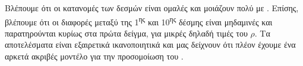 Βλέπουμε ότι οι κατανομές των δεσμών είναι ομαλές και μοιάζουν πολύ με . 
Επίσης, βλέπουμε ότι οι διαφορές μεταξύ της 1\textsuperscript{ης} και 10\textsuperscript{ης} δέσμης είναι μηδαμινές και παρατηρούνται κυρίως στα πρώτα δείγμα, για μικρές δηλαδή τιμές του $\rho$.
Τα αποτελέσματα είναι εξαιρετικά ικανοποιητικά και μας δείχνουν ότι πλέον έχουμε ένα αρκετά ακριβές μοντέλο για την προσομοίωση του .





